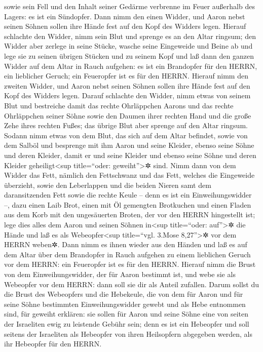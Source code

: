 sowie sein Fell und den Inhalt seiner Gedärme verbrenne im Feuer
außerhalb des Lagers: es ist ein Sündopfer.  Dann nimm
den einen Widder, und Aaron nebst seinen Söhnen sollen ihre Hände fest
auf den Kopf des Widders legen.  Hierauf schlachte den
Widder, nimm sein Blut und sprenge es an den Altar ringsum;
 den Widder aber zerlege in seine Stücke, wasche seine
Eingeweide und Beine ab und lege sie zu seinen übrigen Stücken und zu
seinem Kopf  und laß dann den ganzen Widder auf dem Altar
in Rauch aufgehen: es ist ein Brandopfer für den HERRN, ein lieblicher
Geruch; ein Feueropfer ist es für den HERRN.  Hierauf
nimm den zweiten Widder, und Aaron nebst seinen Söhnen sollen ihre Hände
fest auf den Kopf des Widders legen.  Darauf schlachte
den Widder, nimm etwas von seinem Blut und bestreiche damit das rechte
Ohrläppchen Aarons und das rechte Ohrläppchen seiner Söhne sowie den
Daumen ihrer rechten Hand und die große Zehe ihres rechten Fußes; das
übrige Blut aber sprenge auf den Altar ringsum.  Sodann
nimm etwas von dem Blut, das sich auf dem Altar befindet, sowie von dem
Salböl und besprenge mit ihm Aaron und seine Kleider, ebenso seine Söhne
und deren Kleider, damit er und seine Kleider und ebenso seine Söhne und
deren Kleider geheiligt\textless sup title=``oder:
geweiht''\textgreater✲ sind.  Nimm dann von dem Widder
das Fett, nämlich den Fettschwanz und das Fett, welches die Eingeweide
überzieht, sowie den Leberlappen und die beiden Nieren samt dem
daransitzenden Fett sowie die rechte Keule -- denn es ist ein
Einweihungswidder --,  dazu einen Laib Brot, einen mit Öl
gemengten Brotkuchen und einen Fladen aus dem Korb mit den ungesäuerten
Broten, der vor den HERRN hingestellt ist;  lege dies
alles dem Aaron und seinen Söhnen in\textless sup title=``oder:
auf''\textgreater✲ die Hände und laß es als Webeopfer\textless sup
title=``vgl. 3.Mose 8,27''\textgreater✲ vor dem HERRN weben✲.
 Dann nimm es ihnen wieder aus den Händen und laß es auf
dem Altar über dem Brandopfer in Rauch aufgehen zu einem lieblichen
Geruch vor dem HERRN: ein Feueropfer ist es für den HERRN.
 Hierauf nimm die Brust von dem Einweihungswidder, der
für Aaron bestimmt ist, und webe sie als Webeopfer vor dem HERRN: dann
soll sie dir als Anteil zufallen.  Darum sollst du die
Brust des Webeopfers und die Hebekeule, die von dem für Aaron und für
seine Söhne bestimmten Einweihungswidder gewebt und als Hebe entnommen
sind, für geweiht erklären:  sie sollen für Aaron und
seine Söhne eine von seiten der Israeliten ewig zu leistende Gebühr
sein; denn es ist ein Hebeopfer und soll seitens der Israeliten als
Hebeopfer von ihren Heilsopfern abgegeben werden, als ihr Hebeopfer für
den HERRN.

